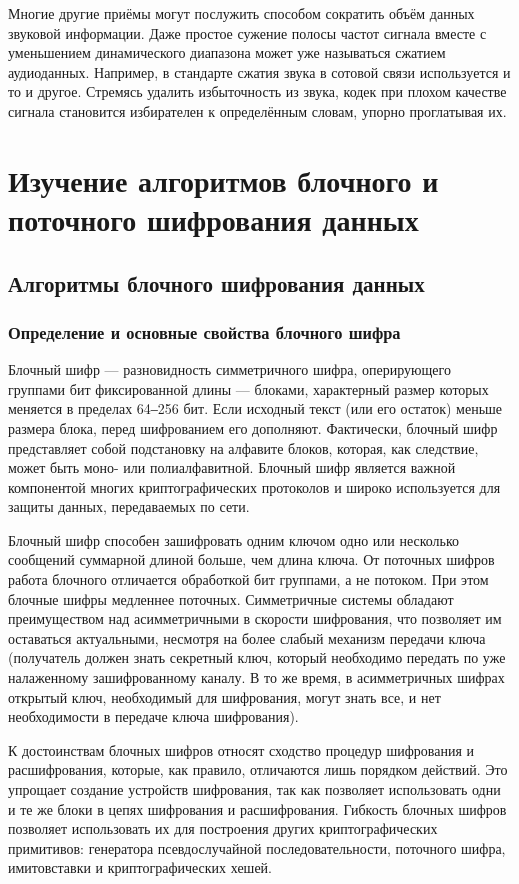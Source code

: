 \documentclass[a4paper]{report}
\begin{document}
Многие другие приёмы могут послужить способом сократить объём данных звуковой информации. Даже простое сужение полосы частот сигнала вместе с уменьшением динамического диапазона может уже называться сжатием аудиоданных. Например, в стандарте сжатия звука в сотовой связи используется и то и другое. Стремясь удалить избыточность из звука, кодек при плохом качестве сигнала становится избирателен к определённым словам, упорно проглатывая их. 

\chapter{Изучение алгоритмов блочного и поточного шифрования данных}
\section{Алгоритмы блочного шифрования данных}
\subsection{Определение и основные свойства блочного шифра}
Блочный шифр — разновидность симметричного шифра, оперирующего группами бит фиксированной длины — блоками, характерный размер которых меняется в пределах 64‒256 бит. Если исходный текст (или его остаток) меньше размера блока, перед шифрованием его дополняют. Фактически, блочный шифр представляет собой подстановку на алфавите блоков, которая, как следствие, может быть моно- или полиалфавитной. Блочный шифр является важной компонентой многих криптографических протоколов и широко используется для защиты данных, передаваемых по сети.

Блочный шифр способен зашифровать одним ключом одно или несколько сообщений суммарной длиной больше, чем длина ключа. От поточных шифров работа блочного отличается обработкой бит группами, а не потоком. При этом блочные шифры медленнее поточных. Симметричные системы обладают преимуществом над асимметричными в скорости шифрования, что позволяет им оставаться актуальными, несмотря на более слабый механизм передачи ключа (получатель должен знать секретный ключ, который необходимо передать по уже налаженному зашифрованному каналу. В то же время, в асимметричных шифрах открытый ключ, необходимый для шифрования, могут знать все, и нет необходимости в передаче ключа шифрования).

К достоинствам блочных шифров относят сходство процедур шифрования и расшифрования, которые, как правило, отличаются лишь порядком действий. Это упрощает создание устройств шифрования, так как позволяет использовать одни и те же блоки в цепях шифрования и расшифрования. 
\newpage Гибкость блочных шифров позволяет использовать их для построения других криптографических примитивов: генератора псевдослучайной последовательности, поточного шифра, имитовставки и криптографических хешей.
\end{document}
